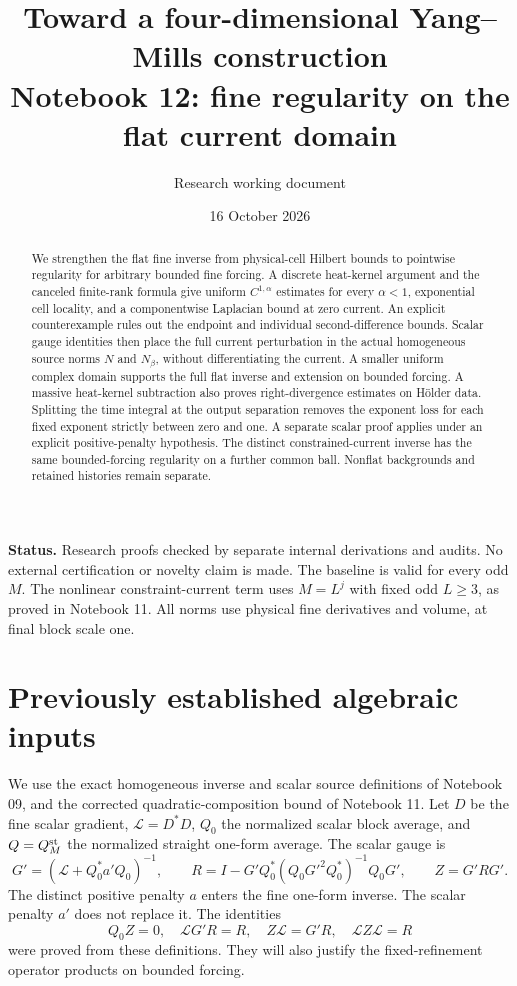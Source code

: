 \documentclass[11pt]{article}
\title{Toward a four-dimensional Yang--Mills construction\\
\large Notebook 12: fine regularity on the flat current domain}
\author{Research working document}
\date{16 October 2026}
\theoremstyle{remark}
\begin{document}
\maketitle
\begin{abstract}
We strengthen the flat fine inverse from physical-cell Hilbert bounds
to pointwise regularity for arbitrary bounded fine forcing. A discrete
heat-kernel argument and the canceled finite-rank formula give uniform
$C^{1,\alpha}$ estimates for every $\alpha<1$, exponential cell locality,
and a componentwise Laplacian bound at zero current. An explicit
counterexample rules out the endpoint and individual second-difference
bounds. Scalar gauge identities then place the full current
perturbation in the actual homogeneous source norms $N$ and $N_\beta$,
without differentiating the current. A smaller uniform complex domain
supports the full flat inverse and extension on bounded forcing.
A massive heat-kernel subtraction also proves right-divergence
estimates on H\"older data. Splitting the time integral at the
output separation removes the exponent loss for each fixed
exponent strictly between zero and one. A separate scalar proof
applies under an explicit positive-penalty hypothesis.
The distinct constrained-current inverse has
the same bounded-forcing regularity on a further common ball.
Nonflat backgrounds and retained histories remain separate.
\end{abstract}

\noindent\textbf{Status.}
Research proofs checked by separate internal derivations and audits.
No external certification or novelty claim is made. The baseline is
valid for every odd $M$. The nonlinear constraint-current term uses
$M=L^j$ with fixed odd $L\ge3$, as proved in Notebook 11. All norms
use physical fine derivatives and volume, at final block scale one.

\section{Previously established algebraic inputs}

We use the exact homogeneous inverse and scalar source definitions of
Notebook 09, and the corrected quadratic-composition bound of Notebook 11.
Let $D$ be the fine scalar gradient, $\mathcal L=D^*D$, $Q_0$ the
normalized scalar block average, and $Q=Q_M^{\rm st}$ the normalized
straight one-form average. The scalar gauge is
\[
 G'=(\mathcal L+Q_0^*a'Q_0)^{-1},\qquad
 R=I-G'Q_0^*(Q_0G'^2Q_0^*)^{-1}Q_0G',\qquad Z=G'RG'.
\]
The distinct positive penalty $a$ enters the fine one-form inverse.
The scalar penalty $a'$ does not replace it. The identities
\[
 Q_0Z=0,\quad \mathcal L G'R=R,\quad
 Z\mathcal L=G'R,\quad \mathcal L Z\mathcal L=R
\]
were proved from these definitions. They will also justify the
fixed-refinement operator products on bounded forcing.
\end{document}
